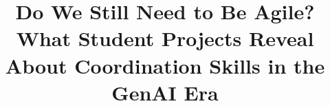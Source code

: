 \documentclass[conference]{IEEEtran}
\title{Do We Still Need to Be Agile? What Student Projects Reveal About Coordination Skills in the GenAI Era}
\author{\IEEEauthorblockN{Anonymous Authors}}
\begin{document}
\maketitle
\raggedbottom










\nocite{*}


\end{document}
